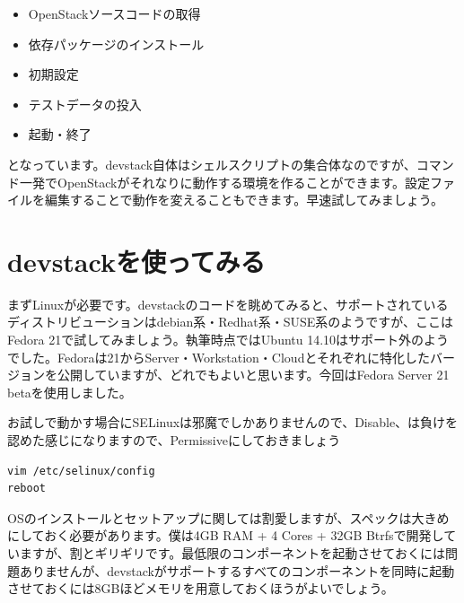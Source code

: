 \documentclass[9pt,b5paper,tombo,openany,dvipdfmx]{jsbook}
\begin{document}
\begin{itemize}
	\item OpenStackソースコードの取得
	\item 依存パッケージのインストール
	\item 初期設定
	\item テストデータの投入
	\item 起動・終了
\end{itemize}

となっています。devstack自体はシェルスクリプトの集合体なのですが、コマンド一発でOpenStackがそれなりに動作する環境を作ることができます。設定ファイルを編集することで動作を変えることもできます。早速試してみましょう。

\section{devstackを使ってみる}

まずLinuxが必要です。devstackのコードを眺めてみると、サポートされているディストリビューションはdebian系・Redhat系・SUSE系のようですが、ここはFedora 21で試してみましょう。執筆時点ではUbuntu 14.10はサポート外のようでした。Fedoraは21からServer・Workstation・Cloudとそれぞれに特化したバージョンを公開していますが、どれでもよいと思います。今回はFedora Server 21 betaを使用しました。

お試しで動かす場合にSELinuxは邪魔でしかありませんので、Disable、は負けを認めた感じになりますので、Permissiveにしておきましょう

\begin{lstlisting}
vim /etc/selinux/config
reboot
\end{lstlisting}

OSのインストールとセットアップに関しては割愛しますが、スペックは大きめにしておく必要があります。僕は4GB RAM + 4 Cores + 32GB Btrfsで開発していますが、割とギリギリです。最低限のコンポーネントを起動させておくには問題ありませんが、devstackがサポートするすべてのコンポーネントを同時に起動させておくには8GBほどメモリを用意しておくほうがよいでしょう。
\end{document}
